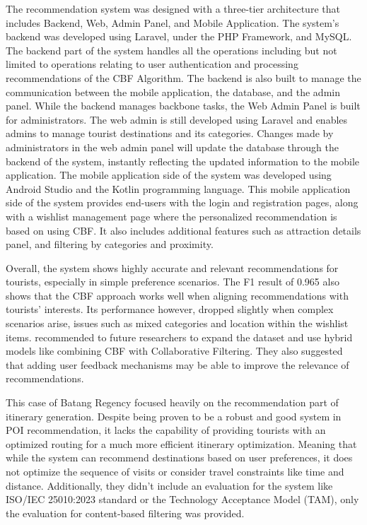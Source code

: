 The recommendation system was designed with a three-tier architecture that includes Backend, Web, Admin Panel, and Mobile Application. The system’s backend was developed using Laravel, under the PHP Framework, and MySQL. The backend part of the system handles all the operations including but not limited to operations relating to user authentication and processing recommendations of the CBF Algorithm. The backend is also built to manage the communication between the mobile application, the database, and the admin panel. While the backend manages backbone tasks, the Web Admin Panel is built for administrators. The web admin is still developed using Laravel and enables admins to manage tourist destinations and its categories. Changes made by administrators in the web admin panel will update the database through the backend of the system, instantly reflecting the updated information to the mobile application. The mobile application side of the system was developed using Android Studio and the Kotlin programming language. This mobile application side of the system provides end-users with the login and registration pages, along with a wishlist management page where the personalized recommendation is based on using CBF. It also includes additional features such as attraction details panel, and filtering by categories and proximity.

Overall, the system shows highly accurate and relevant recommendations for tourists, especially in simple preference scenarios. The F1 result of 0.965 also shows that the CBF approach works well when aligning recommendations with tourists’ interests. Its performance however, dropped slightly when complex scenarios arise, issues such as mixed categories and location within the wishlist items. \textcite{Yulfihani2024} recommended to future researchers to expand the dataset and use hybrid models like combining CBF with Collaborative Filtering. They also suggested that adding user feedback mechanisms may be able to improve the relevance of recommendations.

This case of Batang Regency focused heavily on the recommendation part of itinerary generation. Despite being proven to be a robust and good system in POI recommendation, it lacks the capability of providing tourists with an optimized routing for a much more efficient itinerary optimization. Meaning that while the system can recommend destinations based on user preferences, it does not optimize the sequence of visits or consider travel constraints like time and distance. Additionally, they didn’t include an evaluation for the system like ISO/IEC 25010:2023 standard or the Technology Acceptance Model (TAM), only the evaluation for
content-based filtering was provided.

